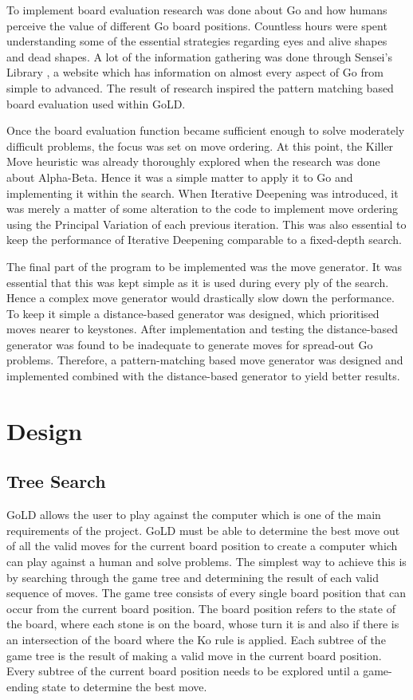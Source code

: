 \documentclass{l4proj}
\begin{document}
To implement board evaluation research was done about Go and how humans perceive the value of different Go board positions. Countless hours were spent understanding some of the essential strategies regarding eyes and alive shapes and dead shapes. A lot of the information gathering was done through Sensei’s Library \cite{Senseis} , a website which has information on almost every aspect of Go from simple to advanced. The result of research inspired the pattern matching based board evaluation used within GoLD.

Once the board evaluation function became sufficient enough to solve moderately difficult problems, the focus was set on move ordering. At this point, the Killer Move heuristic was already thoroughly explored when the research was done about Alpha-Beta. Hence it was a simple matter to apply it to Go and implementing it within the search. When Iterative Deepening was introduced, it was merely a matter of some alteration to the code to implement move ordering using the Principal Variation of each previous iteration. This was also essential to keep the performance of Iterative Deepening comparable to a fixed-depth search.

The final part of the program to be implemented was the move generator. It was essential that this was kept simple as it is used during every ply of the search. Hence a complex move generator would drastically slow down the performance. To keep it simple a distance-based generator was designed, which prioritised moves nearer to keystones. After implementation and testing the distance-based generator was found to be inadequate to generate moves for spread-out Go problems. Therefore, a pattern-matching based move generator was designed and implemented combined with the distance-based generator to yield better results.








\chapter{Design}


\section{Tree Search}
GoLD allows the user to play against the computer which is one of the main requirements of the project.  GoLD must be able to determine the best move out of all the valid moves for the current board position to create a computer which can play against a human and solve problems. The simplest way to achieve this is by searching through the game tree and determining the result of each valid sequence of moves. The game tree consists of every single board position that can occur from the current board position. The board position refers to the state of the board, where each stone is on the board, whose turn it is and also if there is an intersection of the board where the Ko rule is applied. Each subtree of the game tree is the result of making a valid move in the current board position. Every subtree of the current board position needs to be explored until a game-ending state to determine the best move.
\end{document}
